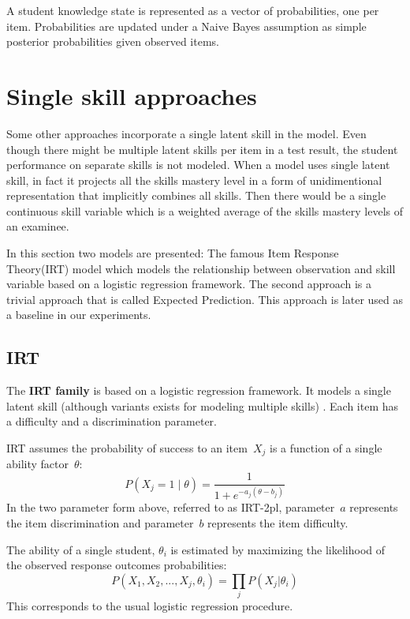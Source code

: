 A student knowledge state is represented as a vector of probabilities, one per item.  Probabilities are updated under a Naive Bayes assumption as simple posterior probabilities given observed items.


\section{Single skill approaches}

Some other approaches incorporate a single latent skill in the model. Even though there might be multiple latent skills per item in a test result, the student performance on separate skills is not modeled. When a model uses single latent skill, in fact it projects all the skills mastery level in a form of unidimentional representation that implicitly combines all skills. Then there would be a single continuous skill variable which is a weighted average of the skills mastery levels of an examinee. 

In this section two models are presented: The famous Item Response Theory(IRT) model which models the relationship between observation and skill variable based on a logistic regression framework. The second approach is a trivial approach that is called Expected Prediction. This approach is later used as a baseline in our experiments.


\subsection{IRT} 

The \textbf{IRT family} is based on a logistic regression framework. It models a single latent skill (although variants exists for modeling multiple skills) \cite{bakerKim2004}.  Each item has a difficulty and a discrimination parameter.

IRT assumes the probability of success to an item~$X_j$ is a function of a single ability factor~$\theta$: 
\[P(X_j\!=\!1\;|\;\theta) = \frac{1}{1+e^{-a_j(\theta-b_j)}}\]
In the two parameter form above, referred to as IRT-2pl, parameter~$a$ represents the item discrimination and parameter~$b$ represents the item difficulty.  

The ability of a single student, $\theta_i$ is estimated by maximizing the likelihood of the observed response outcomes probabilities:
\[ P(X_1, X_2, ..., X_j, \theta_i) = \prod_j P(X_j|\theta_i) \]
This corresponds to the usual logistic regression procedure.

